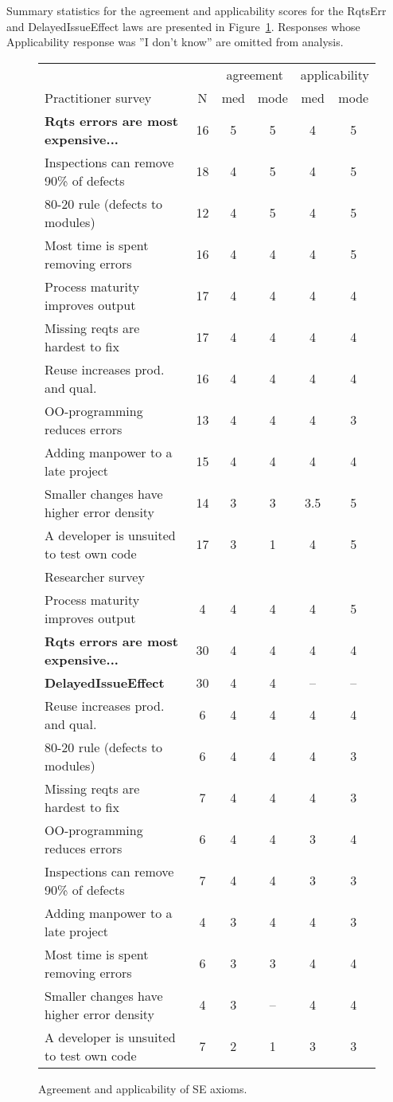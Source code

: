 Summary statistics for the agreement and applicability scores for the RqtsErr and DelayedIssueEffect laws are presented in Figure~\ref{fig:survey_results}. Responses whose Applicability response was ''I don't know'' are omitted from analysis.


\begin{figure}[!ht] 
\scriptsize 
 
\begin{tabular}{l|c|c|c|c|c}
 &  & \multicolumn{2}{c|}{agreement} & \multicolumn{2}{c}{applicability} \\\cline{1-1} 
Practitioner survey  & N & med & mode & med & mode \\
\hline 
\textbf{Rqts errors are most expensive...} & 16 & 5 & 5 & 4 & 5 \\ 
Inspections can remove 90\% of defects & 18 & 4 & 5 & 4 & 5 \\
80-20 rule (defects to modules) & 12 & 4 & 5 & 4 & 5 \\
Most time is spent removing errors & 16 & 4 & 4 & 4 & 5 \\ 
Process maturity improves output & 17 & 4 & 4 & 4 & 4 \\ 
Missing reqts are hardest to fix & 17 & 4 & 4 & 4 & 4 \\
Reuse increases prod. and qual. & 16 & 4 & 4 & 4 & 4 \\
OO-programming reduces errors & 13 & 4 & 4 & 4 & 3 \\
Adding manpower to a late project & 15 & 4 & 4 & 4 & 4 \\
Smaller changes have higher error density & 14 & 3 & 3 & 3.5 & 5 \\
A developer is unsuited to test own code & 17 & 3 & 1 & 4 & 5\\\hline
 
Researcher survey \\\hline 
Process maturity improves output & 4 & 4 & 4 & 4 & 5 \\
\textbf{Rqts errors are most expensive...} & 30 & 4 & 4 & 4 & 4   \\ 
\textbf{DelayedIssueEffect} & 30 & 4 & 4 & -- & --  \\
Reuse increases prod. and qual. & 6 & 4 & 4 & 4 & 4 \\
80-20 rule (defects to modules) & 6 & 4 & 4 & 4 & 3 \\
Missing reqts are hardest to fix & 7 & 4 & 4 & 4 & 3 \\
OO-programming reduces errors & 6 & 4 & 4 & 3 & 4 \\
Inspections can remove 90\% of defects & 7 & 4 & 4 & 3 & 3 \\
Adding manpower to a late project & 4 & 3 & 4 & 4 & 3 \\
Most time is spent removing errors & 6 & 3 & 3 & 4 & 4 \\ 
Smaller changes have higher error density & 4 & 3 & -- & 4 & 4 \\
A developer is unsuited to test own code & 7 & 2 & 1 & 3 & 3
\end{tabular} 
 
\caption{Agreement and applicability of SE axioms.}
\label{fig:survey_results}
\end{figure}

